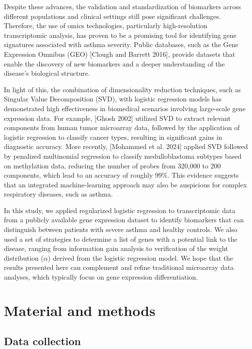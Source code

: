Despite these advances, the validation and standardization of biomarkers across different populations and clinical settings still pose significant challenges. Therefore, the use of omics technologies, particularly high-resolution transcriptomic analysis, has proven to be a promising tool for identifying gene signatures associated with asthma severity. Public databases, such as the Gene Expression Omnibus (GEO) [Clough and Barrett 2016], provide datasets that enable the discovery of new biomarkers and a deeper understanding of the disease's biological structure.

In light of this, the combination of dimensionality reduction techniques, such as Singular Value Decomposition (SVD), with logistic regression models has demonstrated high effectiveness in biomedical scenarios involving large-scale gene expression data. For example, [Ghosh 2002] utilized SVD to extract relevant components from human tumor microarray data, followed by the application of logistic regression to classify cancer types, resulting in significant gains in diagnostic accuracy. More recently, [Mohammed et al. 2024] applied SVD followed by penalized multinomial regression to classify medulloblastoma subtypes based on methylation data, reducing the number of probes from 320,000 to 200 components, which lead to an accuracy of roughly 99\%. This evidence suggests that an integrated machine-learning approach may also be auspicious for complex respiratory diseases, such as asthma.

In this study, we applied regularized logistic regression to transcriptomic data from a publicly available gene expression dataset to identify biomarkers that can distinguish between patients with severe asthma and healthy controls. We also used a set of strategies to determine a list of genes with a potential link to the disease, ranging from information gain analysis to verification of the weight distribution ($\alpha$) derived from the logistic regression model. We hope that the results presented here can complement and refine traditional microarray data analyses, which typically focus on gene expression differentiation.

\section{Material and methods}

\subsection{Data collection}

